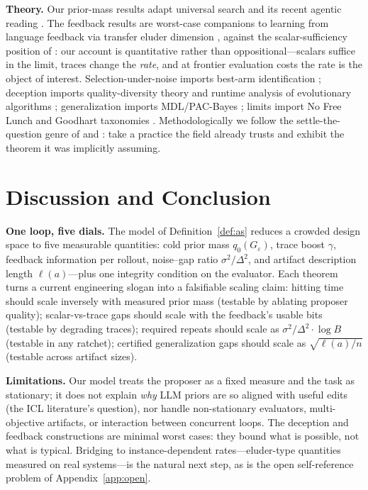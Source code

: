 \documentclass{article}
\theoremstyle{plain}
\theoremstyle{definition}
\theoremstyle{remark}
\newcommand{\len}{\ell}
\newcommand{\eps}{\varepsilon}
\begin{document}
\textbf{Theory.} Our prior-mass results adapt universal search \cite{levin1973universal, schmidhuber2004oops, hutter2005universal} and its recent agentic reading \cite{achille2025universal}. The feedback results are worst-case companions to learning from language feedback via transfer eluder dimension \cite{xu2025llf, cheng2023llfbench}, against the scalar-sufficiency position of \citet{silver2021reward}: our account is quantitative rather than oppositional---scalars suffice in the limit, traces change the \emph{rate}, and at frontier evaluation costs the rate is the object of interest. Selection-under-noise imports best-arm identification \cite{evendar2006action, karnin2013almost, li2017hyperband}; deception imports quality-diversity theory \cite{lehman2011abandoning, mouret2015illuminating} and runtime analysis of evolutionary algorithms \cite{droste2002analysis}; generalization imports MDL/PAC-Bayes \cite{rissanen1978modeling, mcallester1999pac}; limits import No Free Lunch \cite{wolpert1997no} and Goodhart taxonomies \cite{manheim2018categorizing, amodei2016concrete}. Methodologically we follow the settle-the-question genre of \citet{bowling2023settling} and \citet{richens2025general}: take a practice the field already trusts and exhibit the theorem it was implicitly assuming.

\section{Discussion and Conclusion}
\label{sec:discussion}

\textbf{One loop, five dials.} The model of Definition~\ref{def:as} reduces a crowded design space to five measurable quantities: cold prior mass $q_0(G_\eps)$, trace boost $\gamma$, feedback information per rollout, noise--gap ratio $\sigma^2/\Delta^2$, and artifact description length $\len(a)$---plus one integrity condition on the evaluator. Each theorem turns a current engineering slogan into a falsifiable scaling claim: hitting time should scale inversely with measured prior mass (testable by ablating proposer quality); scalar-vs-trace gaps should scale with the feedback's usable bits (testable by degrading traces); required repeats should scale as $\sigma^2/\Delta^2 \cdot \log B$ (testable in any ratchet); certified generalization gaps should scale as $\sqrt{\len(a)/n}$ (testable across artifact sizes).

\textbf{Limitations.} Our model treats the proposer as a fixed measure and the task as stationary; it does not explain \emph{why} LLM priors are so aligned with useful edits (the ICL literature's question), nor handle non-stationary evaluators, multi-objective artifacts, or interaction between concurrent loops. The deception and feedback constructions are minimal worst cases: they bound what is possible, not what is typical. Bridging to instance-dependent rates---eluder-type quantities measured on real systems---is the natural next step, as is the open self-reference problem of Appendix~\ref{app:open}.
\end{document}
